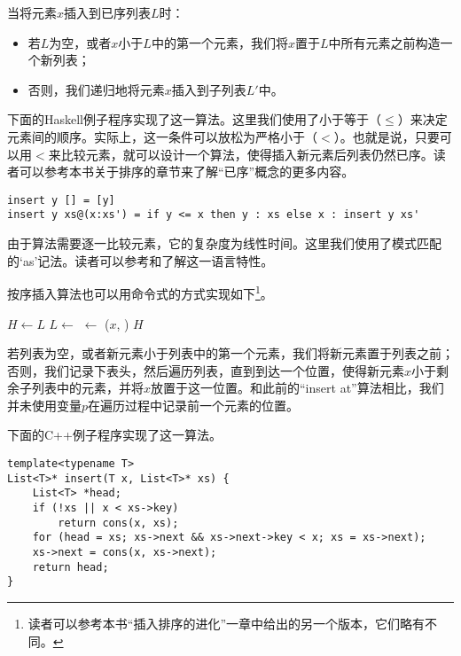 \documentclass[UTF8]{article}
\begin{document}
当将元素$x$插入到已序列表$L$时：

\begin{itemize}
\item 若$L$为空，或者$x$小于$L$中的第一个元素，我们将$x$置于$L$中所有元素之前构造一个新列表；
\item 否则，我们递归地将元素$x$插入到子列表$L'$中。
\end{itemize}

下面的Haskell例子程序实现了这一算法。这里我们使用了小于等于（$\leq$）来决定元素间的顺序。实际上，这一条件可以放松为严格小于（$<$）。也就是说，只要可以用$<$来比较元素，就可以设计一个算法，使得插入新元素后列表仍然已序。读者可以参考本书关于排序的章节来了解“已序”概念的更多内容。

\lstset{language=Haskell}
\begin{lstlisting}[style=Haskell]
insert y [] = [y]
insert y xs@(x:xs') = if y <= x then y : xs else x : insert y xs'
\end{lstlisting}

由于算法需要逐一比较元素，它的复杂度为线性时间。这里我们使用了模式匹配的‘as’记法。读者可以参考\cite{learn-haskell}和\cite{algo-fp}了解这一语言特性。

按序插入算法也可以用命令式的方式实现如下\footnote{读者可以参考本书“插入排序的进化”一章中给出的另一个版本，它们略有不同。}。

\begin{algorithmic}[1]
    \State \Return {}
  \EndIf
  \State $H \gets L$
    \State $L \gets $ 
  \EndWhile
  \State {} $\gets$ ($x$, )
  \State \Return $H$
\EndFunction
\end{algorithmic}

若列表为空，或者新元素小于列表中的第一个元素，我们将新元素置于列表之前；否则，我们记录下表头，然后遍历列表，直到到达一个位置，使得新元素$x$小于剩余子列表中的元素，并将$x$放置于这一位置。和此前的“insert at”算法相比，我们并未使用变量$p$在遍历过程中记录前一个元素的位置。

下面的C++例子程序实现了这一算法。

\lstset{language=C++}
\begin{lstlisting}
template<typename T>
List<T>* insert(T x, List<T>* xs) {
    List<T> *head;
    if (!xs || x < xs->key)
        return cons(x, xs);
    for (head = xs; xs->next && xs->next->key < x; xs = xs->next);
    xs->next = cons(x, xs->next);
    return head;
}
\end{lstlisting}
\end{document}
